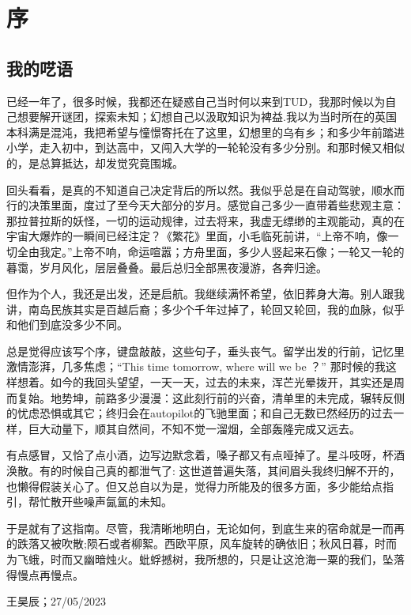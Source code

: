 \chapter{ 序}
\section{我的呓语}
已经一年了，很多时候，我都还在疑惑自己当时何以来到TUD，我那时候以为自己想要解开谜团，探索未知；幻想自己以汲取知识为裨益.我以为当时所在的英国本科满是混沌，我把希望与憧憬寄托在了这里，幻想里的乌有乡；和多少年前踏进小学，走入初中，到达高中，又闯入大学的一轮轮没有多少分别。和那时候又相似的，是总算抵达，却发觉究竟围城。

回头看看，是真的不知道自己决定背后的所以然。我似乎总是在自动驾驶，顺水而行的决策里面，度过了至今天大部分的岁月。感觉自己多少一直带着些悲观主意：那拉普拉斯的妖怪，一切的运动规律，过去将来，我虚无缥缈的主观能动，真的在宇宙大爆炸的一瞬间已经注定？《繁花》里面，小毛临死前讲，“上帝不响，像一切全由我定。”上帝不响，命运喧嚣；方舟里面，多少人竖起来石像；一轮又一轮的暮霭，岁月风化，层层叠叠。最后总归全部黑夜漫游，各奔归途。

但作为个人，我还是出发，还是启航。我继续满怀希望，依旧葬身大海。别人跟我讲，南岛民族其实是百越后裔；多少个千年过掉了，轮回又轮回，我的血脉，似乎和他们到底没多少不同。

总是觉得应该写个序，键盘敲敲，这些句子，垂头丧气。留学出发的行前，记忆里激情澎湃，几多焦虑；“This time tomorrow, where will we be ？” 那时候的我这样想着。如今的我回头望望，一天一天，过去的未来，浑芒光晕拨开，其实还是周而复始。地势坤，前路多少漫漫：这此刻行前的兴奋，清单里的未完成，辗转反侧的忧虑恐惧或其它；终归会在autopilot的飞驰里面；和自己无数已然经历的过去一样，巨大动量下，顺其自然间，不知不觉一溜烟，全部轰隆完成又远去。

有点感冒，又恰了点小酒，边写边默念着，嗓子都又有点哑掉了。星斗吱呀，杯酒涣散。有的时候自己真的都泄气了: 这世道普遍失落，其间眉头我终归解不开的，也懒得假装关心了。但又总自以为是，觉得力所能及的很多方面，多少能给点指引，帮忙散开些噪声氤氲的未知。

于是就有了这指南。尽管，我清晰地明白，无论如何，到底生来的宿命就是一而再的跌落又被吹散;陨石或者柳絮。西欧平原，风车旋转的确依旧；秋风日暮，时而为飞蛾，时而又幽暗烛火。蚍蜉撼树，我所想的，只是让这沧海一粟的我们，坠落得慢点再慢点。
\begin{flushright}
王昊辰；27/05/2023
\end{flushright}

\vspace{\betsubsec} %
